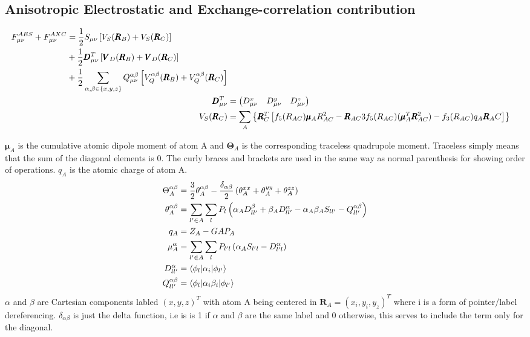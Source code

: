 \subsection{Anisotropic Electrostatic and Exchange-correlation contribution}
\begin{align}
    \begin{split}
    F^{AES}_{\mu\nu}+F^{AXC}_{\mu\nu} &= \frac{1}{2}S_{\mu\nu}\left[V_S(\pmb{R}_B)+ V_S(\pmb{R}_C)\right]\\
    &+ \frac{1}{2}\pmb{D}^T_{\mu\nu}\left[\pmb{V}_D(\pmb{R}_B)+\pmb{V}_D(\pmb{R}_C)\right]\\
    &+ \frac{1}{2} \sum_{\alpha,\beta\in\{x,y,z\}} Q^{\alpha\beta}_{\mu\nu}\left[V_Q^{\alpha\beta}(\pmb{R}_B)+ V_Q^{\alpha\beta}(\pmb{R}_C)\right]
    \end{split}\\
    \pmb{D}^T_{\mu\nu} &=
    \begin{pmatrix}
        D^x_{\mu\nu} &
        D^y_{\mu\nu} &
        D^z_{\mu\nu}\\
    \end{pmatrix}\\
    V_S(\pmb{R}_C) &= \sum_A \left\{
        \pmb{R}_C^T\left[
            f_5(R_{AC})\pmb{\mu}_AR^2_{AC} - 
            \pmb{R}_{AC}3f_5(R_{AC})(\pmb{\mu}_A^T\pmb{R}^2_{AC}) - 
            f_3(R_{AC})q_A\pmb{R}_AC
        \right]
        \right\}
\end{align}

$\pmb{\mu}_A$ is the cumulative atomic dipole moment of atom A and $\pmb{\Theta}_A$ is the corresponding traceless quadrupole moment. Traceless simply means that the sum of the diagonal elements is 0. The curly braces and brackets are used in the same way as normal parenthesis for showing order of operations. $q_A$ is the atomic charge of atom A. 
\begin{align}
    \Theta_A^{\alpha\beta} &= \frac{3}{2} \theta_A^{\alpha\beta} - \frac{\delta_{\alpha\beta}}{2} \left( \theta_A^{xx} + \theta_A^{yy} + \theta_A^{zz} \right)\\
    \theta_A^{\alpha\beta} &= \sum_{l' \in A} \sum_{l} P_{l} \left( \alpha_A D_{ll'}^{\beta} + \beta_A D_{ll'}^{\alpha} - \alpha_A \beta_A S_{ll'} - Q_{ll'}^{\alpha\beta} \right)\\
    q_A &= Z_A - GAP_A\\
    \mu_A^{\alpha} &= \sum_{l' \in A} \sum_{l} P_{l'l} \left( \alpha_A S_{l'l} - D_{l'l}^{\alpha} \right)\\
D_{ll'}^{\alpha} &= \braket{ \phi_{l} | \alpha_i | \phi_{l'}}\\
Q_{ll'}^{\alpha\beta} &= \braket{ \phi_{l} | \alpha_i\beta_i | \phi_{l'}}
\end{align}
$\alpha$ and $\beta$ are Cartesian components labled $(x,y,z)^T$ with atom A being centered in $\pmb{R}_A = (x_i,y_i,y_z)^T$ where i is a form of pointer/label dereferencing. $\delta_{\alpha\beta}$ is just the delta function, i.e is is 1 if $\alpha$ and $\beta$ are the same label and 0 otherwise, this serves to include the term only for the diagonal. 

